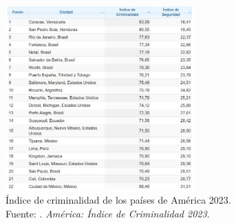 \begin{figure}[h]
	\begin{center}
		\includegraphics[width=0.65\textwidth]{1/figures/fig11.jpg}
		\caption[Índice de criminalidad de los países de América 2023]{Índice de criminalidad de los países de América 2023. \\ Fuente: \parencite{cu_numbeo2023}. \textit{América: Índice de Criminalidad 2023}.}
		\label{1:fig}
	\end{center}
\end{figure}

